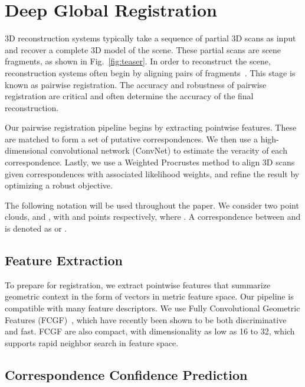 \documentclass[10pt,twocolumn,letterpaper]{article}
\begin{document}
 \section{Deep Global Registration}

3D reconstruction systems typically take a sequence of partial 3D scans as input and recover a complete 3D model of the scene. These partial scans are scene fragments, as shown in Fig.~\ref{fig:teaser}. In order to reconstruct the scene, reconstruction systems often begin by aligning pairs of fragments~\cite{choi2015cvpr}. This stage is known as pairwise registration. The accuracy and robustness of pairwise registration are critical and often determine the accuracy of the final reconstruction.

Our pairwise registration pipeline begins by extracting pointwise features. These are matched to form a set of putative correspondences. We then use a high-dimensional convolutional network (ConvNet) to estimate the veracity of each correspondence. Lastly, we use a Weighted Procrustes method to align 3D scans given correspondences with associated likelihood weights, and refine the result by optimizing a robust objective.




The following notation will be used throughout the paper. We consider two point clouds,  and , with  and  points respectively, where . A correspondence between  and  is denoted as  or .





\subsection{Feature Extraction}
\label{sec:features}

To prepare for registration, we extract pointwise features that summarize geometric context in the form of vectors in metric feature space. Our pipeline is compatible with many feature descriptors. We use Fully Convolutional Geometric Features (FCGF)~\cite{FCGF2019}, which have recently been shown to be both discriminative and fast. FCGF are also compact, with dimensionality as low as 16 to 32, which supports rapid neighbor search in feature space.






\subsection{Correspondence Confidence Prediction}
\label{sec:6dconvnet}
\end{document}
